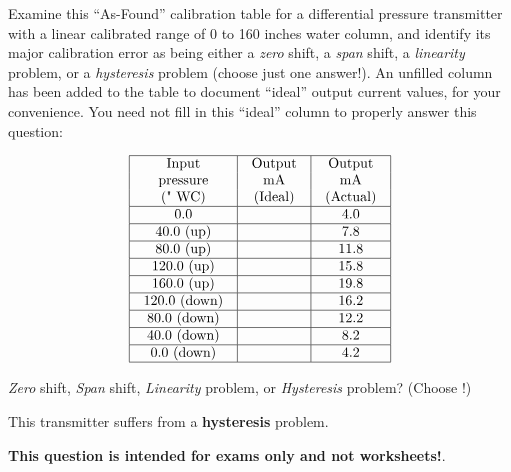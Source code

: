

Examine this ``As-Found'' calibration table for a differential pressure transmitter with a linear calibrated range of 0 to 160 inches water column, and identify its major calibration error as being either a {\it zero} shift, a {\it span} shift, a {\it linearity} problem, or a {\it hysteresis} problem (choose just one answer!).  An unfilled column has been added to the table to document ``ideal'' output current values, for your convenience.  You need not fill in this ``ideal'' column to properly answer this question:


$$\vbox{\offinterlineskip
\halign{\strut
\vrule \quad\hfil # \ \hfil & 
\vrule \quad\hfil # \ \hfil & 
\vrule \quad\hfil # \ \hfil \vrule \cr
\noalign{\hrule}
%
Input & Output & Output \cr
%
pressure & mA & mA \cr
%
(" WC) & (Ideal) & (Actual) \cr
%
\noalign{\hrule}
%
0.0 & & 4.0 \cr
%
\noalign{\hrule}
%
40.0 (up) & & 7.8 \cr
%
\noalign{\hrule}
%
80.0 (up) & & 11.8 \cr
%
\noalign{\hrule}
%
120.0 (up) & & 15.8 \cr
%
\noalign{\hrule}
%
160.0 (up) & & 19.8 \cr
%
\noalign{\hrule}
%
120.0 (down) & & 16.2 \cr
%
\noalign{\hrule}
%
80.0 (down) & & 12.2 \cr
%
\noalign{\hrule}
%
40.0 (down) & & 8.2 \cr
%
\noalign{\hrule}
%
0.0 (down) & & 4.2 \cr
%
\noalign{\hrule}
} %
}$$ %

{\it Zero} shift, {\it Span} shift, {\it Linearity} problem, or {\it Hysteresis} problem?  (Choose !)







This transmitter suffers from a {\bf hysteresis} problem.







{\bf This question is intended for exams only and not worksheets!}.



